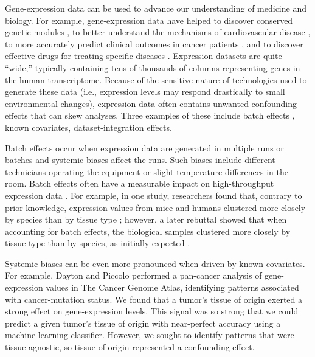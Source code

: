 \documentclass[11pt]{article}
\begin{document}
Gene-expression data can be used to advance our understanding of medicine and biology.
For example, gene-expression data have helped to discover conserved genetic modules \citep{stuart_gene-coexpression_2003}, to better understand the mechanisms of cardiovascular disease \citep{henriksen_application_2002}, to more accurately predict clinical outcomes in cancer patients \citep{veer_gene_2002}, and to discover effective drugs for treating specific diseases \citep{sirota_discovery_2011}.
Expression datasets are quite ``wide,'' typically containing tens of thousands of columns representing genes in the human transcriptome.
Because of the sensitive nature of technologies used to generate these data (i.e., expression levels may respond drastically to small environmental changes), expression data often contains unwanted confounding effects that can skew analyses.
Three examples of these include batch effects \label{it:batch}, known covariates, dataset-integration effects.

Batch effects occur when expression data are generated in multiple runs or batches and systemic biases affect the runs. Such biases include different technicians operating the equipment or slight temperature differences in the room.
Batch effects often have a measurable impact on high-throughput expression data \citep{leek_tackling_2010}.
For example, in one study, researchers found that, contrary to prior knowledge, expression values from mice and humans clustered more closely by species than by tissue type \citep{yue_comparative_2014};
however, a later rebuttal showed that when accounting for batch effects, the biological samples clustered more closely by tissue type than by species, as initially expected \citep{gilad_reanalysis_2015}.

Systemic biases can be even more pronounced when driven by known covariates.
For example, Dayton and Piccolo performed a pan-cancer analysis of gene-expression values in The Cancer Genome Atlas, identifying patterns associated with cancer-mutation status\citep{dayton_classifying_2017-1}.
We found that a tumor's tissue of origin exerted a strong effect on gene-expression levels.
This signal was so strong that we could predict a given tumor's tissue of origin with near-perfect accuracy using a machine-learning classifier.
However, we sought to identify patterns that were tissue-agnostic, so tissue of origin represented a confounding effect.

\end{document}
